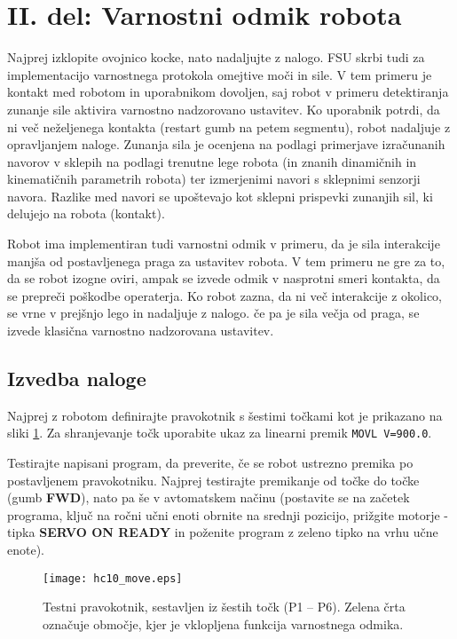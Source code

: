 \section{II. del: Varnostni odmik robota} \label{poglavje2del_vaje}

Najprej izklopite ovojnico kocke, nato nadaljujte z nalogo. FSU skrbi tudi za implementacijo varnostnega protokola omejtive moči in sile. V tem primeru je kontakt med robotom in uporabnikom dovoljen, saj robot v primeru detektiranja zunanje sile aktivira varnostno nadzorovano ustavitev. Ko uporabnik potrdi, da ni več neželjenega kontakta (restart gumb na petem segmentu), robot nadaljuje z opravljanjem naloge. Zunanja sila je ocenjena na podlagi primerjave izračunanih navorov v sklepih na podlagi trenutne lege robota (in znanih dinamičnih in kinematičnih parametrih robota) ter izmerjenimi navori s sklepnimi senzorji  navora. Razlike med navori se upoštevajo kot sklepni prispevki zunanjih sil, ki delujejo na robota (kontakt).

Robot ima implementiran tudi varnostni odmik v primeru, da je sila interakcije manjša od postavljenega praga za ustavitev robota. V tem primeru ne gre za to, da se robot izogne oviri, ampak se izvede odmik v nasprotni smeri kontakta, da se prepreči poškodbe operaterja. Ko robot zazna, da ni več interakcije z okolico, se vrne v prejšnjo lego in nadaljuje z nalogo. če pa je sila večja od praga, se izvede klasična varnostno nadzorovana ustavitev.

\subsection{Izvedba naloge} \label{realni2}

Najprej z robotom definirajte pravokotnik s šestimi točkami kot je prikazano na sliki \ref{fig:hc10_move}. Za shranjevanje točk uporabite ukaz za linearni premik \verb"MOVL V=900.0".

Testirajte napisani program, da preverite, če se robot ustrezno premika po postavljenem pravokotniku. Najprej testirajte premikanje od točke do točke (gumb \textbf{FWD}), nato pa še v avtomatskem načinu (postavite se na začetek programa, ključ na ročni učni enoti obrnite na srednji pozicijo, prižgite motorje - tipka \textbf{SERVO ON READY} in poženite program z zeleno tipko na vrhu učne enote).

\begin{figure}[!hbt]
	\centering
	\texttt{[image: hc10\_move.eps]}
	\caption{Testni pravokotnik, sestavljen iz šestih točk (P1 -- P6). Zelena črta označuje območje, kjer je vklopljena funkcija varnostnega odmika. }
	\label{fig:hc10_move}
\end{figure}

